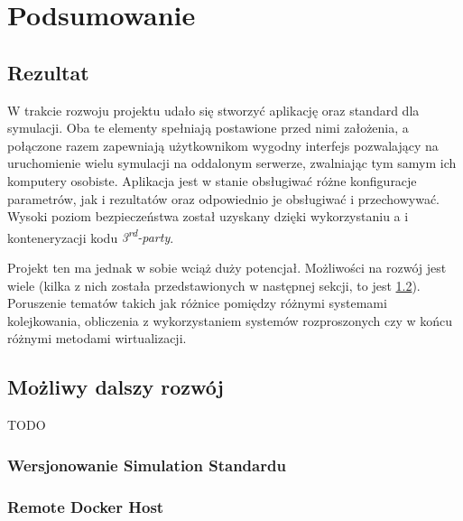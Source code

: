 \chapter{Podsumowanie}
\label{cha:podsumowanie}

\section{Rezultat}

\par W trakcie rozwoju projektu udało się stworzyć aplikację oraz standard dla symulacji. Oba te elementy spełniają postawione przed nimi założenia, a połączone razem zapewniają użytkownikom wygodny interfejs pozwalający na uruchomienie wielu symulacji na oddalonym serwerze, zwalniając tym samym ich komputery osobiste. Aplikacja jest w stanie obsługiwać różne konfiguracje parametrów, jak i rezultatów oraz odpowiednio je obsługiwać i przechowywać. Wysoki poziom bezpieczeństwa został uzyskany dzięki wykorzystaniu \emph{\docker}a i konteneryzacji kodu \emph{3\textsuperscript{rd}-party}.

\par Projekt ten ma jednak w sobie wciąż duży potencjał. Możliwości na rozwój jest wiele (kilka z nich została przedstawionych w następnej sekcji, to jest \ref{sec:mozliwyDalszyRozwoj}). Poruszenie tematów takich jak różnice pomiędzy różnymi systemami kolejkowania, obliczenia z wykorzystaniem systemów rozproszonych czy w końcu różnymi metodami wirtualizacji.

\section{Możliwy dalszy rozwój}
\label{sec:mozliwyDalszyRozwoj}

TODO %

\subsection{Wersjonowanie Simulation Standardu}

\subsection{Remote Docker Host} %
